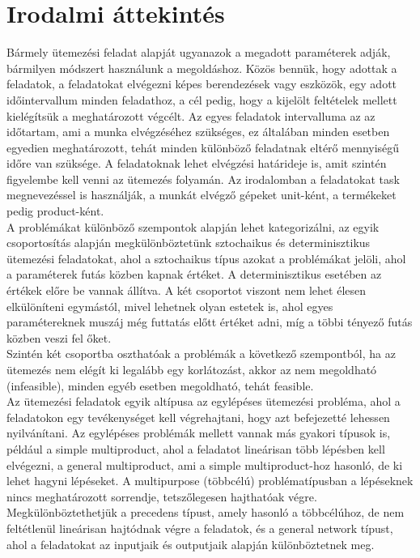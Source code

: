 \documentclass {report}
\begin{document}
\chapter{Irodalmi áttekintés}
Bármely ütemezési feladat alapját ugyanazok a megadott paraméterek adják, bármilyen módszert használunk a megoldáshoz. Közös bennük, hogy adottak a feladatok, a feladatokat elvégezni képes berendezések vagy eszközök, egy adott időintervallum minden feladathoz, a cél pedig, hogy a kijelölt feltételek mellett kielégítsük a meghatározott végcélt. Az egyes feladatok  intervalluma az az  időtartam, ami a munka elvégzéséhez szükséges, ez általában minden esetben egyedien meghatározott, tehát minden különböző feladatnak eltérő mennyiségű időre van szüksége. A feladatoknak lehet elvégzési határideje is, amit szintén figyelembe kell venni az ütemezés folyamán. Az irodalomban a feladatokat task megnevezéssel is használják, a munkát elvégző gépeket unit-ként, a termékeket pedig product-ként. \\
A problémákat különböző szempontok alapján lehet kategorizálni, az egyik csoportosítás alapján megkülönböztetünk sztochaikus és determinisztikus ütemezési feladatokat, ahol a sztochaikus típus azokat a problémákat jelöli, ahol a paraméterek futás közben kapnak értéket. A determinisztikus esetében az értékek előre be vannak állítva. A két csoportot viszont nem lehet élesen elkülöníteni egymástól, mivel lehetnek olyan estetek is, ahol egyes paramétereknek muszáj még futtatás előtt értéket adni, míg a többi tényező futás közben veszi fel őket.\\
Szintén két csoportba oszthatóak a problémák a következő szempontból, ha az ütemezés nem elégít ki legalább egy korlátozást, akkor az nem megoldható (infeasible), minden egyéb esetben megoldható, tehát feasible. \\
Az ütemezési feladatok egyik altípusa az egylépéses ütemezési probléma, ahol a feladatokon egy tevékenységet kell végrehajtani, hogy azt befejezetté lehessen nyilvánítani. Az egylépéses problémák mellett vannak más gyakori típusok is, például a simple multiproduct, ahol a feladatot lineárisan több lépésben kell elvégezni, a general multiproduct, ami a simple multiproduct-hoz hasonló, de ki lehet hagyni lépéseket. A multipurpose (többcélú) problématípusban a lépéseknek nincs meghatározott sorrendje, tetszőlegesen hajthatóak végre. Megkülönböztethetjük a precedens típust, amely hasonló a többcélúhoz, de nem feltétlenül lineárisan hajtódnak végre a feladatok, és a general network típust, ahol a feladatokat az inputjaik és outputjaik alapján különböztetnek meg.\\  
\end{document}
